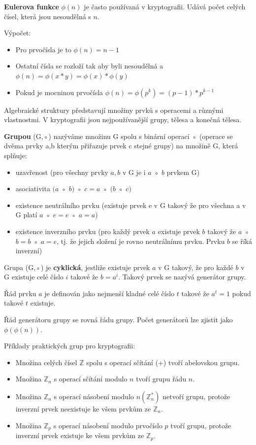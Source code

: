 \textbf{Eulerova funkce} $\phi(n)$ je často používaná v kryptografii. Udává počet celých čísel, která jsou nesoudělná s $n$.

Výpočet:
\begin{itemize}[noitemsep]
    \item Pro prvočísla je to $\phi(n) = n - 1$
    \item Ostatní čísla se rozloží tak aby byli nesoudělná a $\phi(n) = \phi(x * y) = \phi(x) * \phi(y)$
    \item Pokud je mocninou prvočísla $\phi(n) = \phi(p^k) = (p-1)* p^{k-1}$
\end{itemize}

Algebraické struktury představují množiny prvků s operacemi a různými vlastnostmi. V kryptografii jsou nejpoužívanější grupy, tělesa a konečná tělesa.

\textbf{Grupou} (G,◦) nazýváme množinu G spolu s binární operací ◦ (operace se dvěma prvky a,b kterým přiřazuje prvek c stejné grupy) na množině G, která splňuje:
\begin{itemize}[noitemsep]
    \item uzavřenost (pro všechny prvky $a, b$ v G je i $a$ ◦ $b$ prvkem G)
    \item asociativita $(a$ ◦ $b)$ ◦ $c = a$ ◦ $(b$ ◦ $c)$
    \item existence neutrálního prvku (existuje prvek e v G takový že pro všechna a v G platí $a$ ◦ $e = e$ ◦ $a = a$)
    \item existence inverzního prvku (pro každý prvek $a$ existuje prvek $b$ takový že $a$ ◦ $b = b$ ◦ $a = e$, tj. že jejich složení je rovno neutrálnímu prvku. Prvku $b$ se říká inverzní)
\end{itemize}

Grupa (G,◦) je \textbf{cyklická}, jestliže existuje prvek $a$ v G takový, že pro každé $b$ v G existuje celé číslo $i$ takové že $b = a^i$. Takový prvek se nazývá generátor grupy. 

Řád prvku $a$ je definován jako nejmenší kladné celé číslo $t$ takové že $a^t = 1$ pokud takové $t$ existuje. 

Řád generátoru grupy se rovná řádu grupy. Počet generátorů lze zjistit jako $\phi(\phi(n))$.

Příklady praktických grup pro kryptografii:
\begin{itemize}[noitemsep]
    \item Množina celých čísel $\mathbb{Z}$ spolu s operací sčítání (+) tvoří abelovskou grupu.
    \item Množina $\mathbb{Z}_n$ s operací sčítání modulo $n$ tvoří grupu řádu $n$.
    \item Množina $\mathbb{Z}_n$ s operací násobení modulo $n (\mathbb{Z}_n^*)$ netvoří grupu, protože inverzní prvek neexistuje ke všem prvkům ze $\mathbb{Z}_n$.
    \item Množina $\mathbb{Z}_p$ s operací násobení modulo prvočíslo $p$ tvoří grupu, protože inverzní prvek existuje ke všem prvkům ze $\mathbb{Z}_p$. 
\end{itemize}

